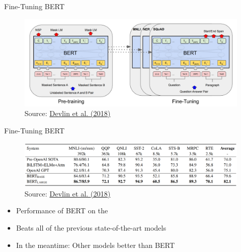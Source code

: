 \documentclass[]{beamer}
\begin{document}
\begin{frame}{Fine-Tuning BERT}
\begin{figure}
\centering
\includegraphics[width = 11cm]{figure/bert-tasks.png}\\ 
\footnotesize{Source:} \href{https://arxiv.org/pdf/1810.04805.pdf}{\footnotesize Devlin et al. (2018)}
\end{figure}
\end{frame}



\begin{frame}{Fine-Tuning BERT} \label{bert-glue}
\begin{figure}
\centering
\includegraphics[width = 11cm]{figure/bert-sota.png}\\ 
\footnotesize{Source:} \href{https://arxiv.org/pdf/1810.04805.pdf}{\footnotesize Devlin et al. (2018)}
\end{figure}
\begin{itemize}
	\item Performance of BERT on the \href{https://gluebenchmark.com/}{}
	\item Beats all of the previous state-of-the-art models
	\item In the meantime: Other models better than BERT
\end{itemize}
\end{frame}
\end{document}

